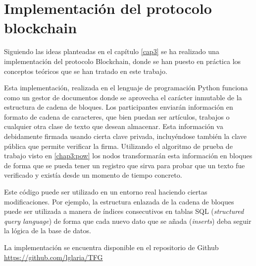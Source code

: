 \cleardoublepage

\chapter{Implementación del protocolo blockchain}\label{implementacion}
Siguiendo las ideas planteadas en el capítulo \ref{cap3} se ha realizado una implementación del protocolo Blockchain, donde se han puesto en práctica los conceptos teóricos que se han tratado en este trabajo. 


Esta implementación, realizada en el lenguaje de programación Python funciona como un gestor de documentos donde se aprovecha el carácter inmutable de la estructura de cadena de bloques. Los participantes enviarán información en formato de cadena de caracteres, que bien puedan ser artículos, trabajos o cualquier otra clase de texto que desean almacenar. Esta información va debidamente firmada usando cierta clave privada, incluyéndose también la clave pública que permite verificar la firma. Utilizando el algoritmo de prueba de trabajo visto en \ref{chap3:pow} los nodos transformarán esta información en bloques de forma que se pueda tener un registro que sirva para probar que un texto fue verificado y existía desde un momento de tiempo concreto.

Este código puede ser utilizado en un entorno real haciendo ciertas modificaciones. Por ejemplo, la estructura enlazada de la cadena de bloques puede ser utilizada a manera de índices consecutivos en tablas SQL (\textit{structured query language}) de forma que cada nuevo dato que se añada (\textit{inserts}) deba seguir la lógica de la base de datos.



La implementación se encuentra disponible en el repositorio de Github \url{https://github.com/lglaria/TFG}

